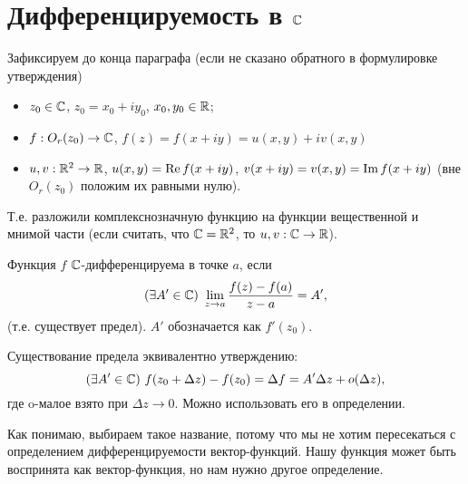 
\section{Дифференцируемость в $\mathbb{C}$}

Зафиксируем до конца параграфа (если не сказано обратного в формулировке утверждения)
\begin{itemize}
	\item $z_0 \in \mathbb{C}$, $z_0 = x_0 + i y_0$, $x_0, y_0 \in \mathbb{R}$;
	\item $f: O_r(z_0) \to \mathbb{C}$, $f(z) = f(x + iy) = u(x, y) + i v(x, y)$
	\item $u, v: \mathbb{R}^2 \to \mathbb{R}$, $u(x, y) = \operatorname{Re} f(x + i y)$, $v(x + iy) = v(x, y) = \operatorname{Im} f(x + i y)$ (вне $O_r(z_0)$ положим их равными нулю).
\end{itemize}
Т.е. разложили комплекснозначную функцию на функции вещественной и мнимой части (если считать, что $\mathbb{C} = \mathbb{R}^2$, то $u, v: \mathbb{C} \to \mathbb{R}$).

\begin{definition}
	Функция $f$ $\mathbb{C}$-дифференцируема в точке $a$, если
	\[
	(\exists A' \in \mathbb{C}) \,\, \lim\limits_{z \to a} \frac{f(z) - f(a)}{z - a} = A',
	\]
	(т.е. существует предел). $A'$ обозначается как $f'(z_0)$.
\end{definition}
\begin{note}
	Существование предела эквивалентно утверждению:
	\[
		(\exists A' \in \mathbb{C}) \,\, f(z_0 + \Delta z) - f(z_0) = \Delta f = A' \Delta z + o(\Delta z),
	\]
	где o-малое взято при $\Delta z \to 0$. Можно использовать его в определении.	
\end{note}
\begin{anote}
	Как понимаю, выбираем такое название, потому что мы не хотим пересекаться с определением дифференцируемости вектор-функций. Нашу функция может быть воспринята как вектор-функция, но нам нужно другое определение.
\end{anote}


